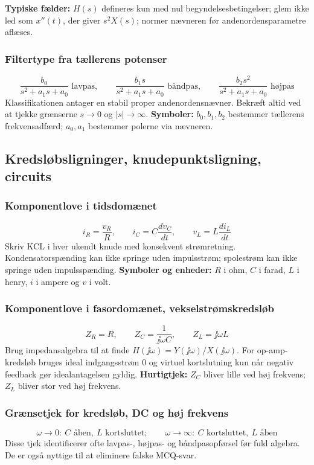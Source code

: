 \textbf{Typiske fælder:} \(H(s)\) defineres kun med nul begyndelsesbetingelser; glem ikke led som \(x''(t)\), der giver \(s^2X(s)\); normer nævneren før andenordensparametre aflæses.

\subsubsection{Filtertype fra tællerens potenser}
\[
\frac{b_0}{s^2+a_1s+a_0}\text{ lavpas},\qquad
\frac{b_1s}{s^2+a_1s+a_0}\text{ båndpas},\qquad
\frac{b_2s^2}{s^2+a_1s+a_0}\text{ højpas}
\]
Klassifikationen antager en stabil proper andenordensnævner. Bekræft altid ved at tjekke grænserne \(s\to0\) og \(|s|\to\infty\).
\textbf{Symboler:} \(b_0,b_1,b_2\) bestemmer tællerens frekvensadfærd; \(a_0,a_1\) bestemmer polerne via nævneren.

\subsection{Kredsløbsligninger, knudepunktsligning, circuits}

\subsubsection{Komponentlove i tidsdomænet}
\[
i_R=\frac{v_R}{R},\qquad i_C=C\frac{dv_C}{dt},\qquad v_L=L\frac{di_L}{dt}
\]
Skriv KCL i hver ukendt knude med konsekvent strømretning. Kondensatorspænding kan ikke springe uden impulsstrøm; spolestrøm kan ikke springe uden impulsspænding.
\textbf{Symboler og enheder:} \(R\) i ohm, \(C\) i farad, \(L\) i henry, \(i\) i ampere og \(v\) i volt.

\subsubsection{Komponentlove i fasordomænet, vekselstrømskredsløb}
\[
Z_R=R,\qquad Z_C=\frac{1}{\jj\omega C},\qquad Z_L=\jj\omega L
\]
Brug impedansalgebra til at finde \(H(\jj\omega)=Y(\jj\omega)/X(\jj\omega)\). For op-amp-kredsløb bruges ideal indgangsstrøm \(0\) og virtuel kortslutning kun når negativ feedback gør idealantagelsen gyldig.
\textbf{Hurtigtjek:} \(Z_C\) bliver lille ved høj frekvens; \(Z_L\) bliver stor ved høj frekvens.

\subsubsection{Grænsetjek for kredsløb, DC og høj frekvens}
\[
\omega\to0:\ C\text{ åben},\ L\text{ kortsluttet};\qquad
\omega\to\infty:\ C\text{ kortsluttet},\ L\text{ åben}
\]
Disse tjek identificerer ofte lavpas-, højpas- og båndpasopførsel før fuld algebra. De er også nyttige til at eliminere falske MCQ-svar.

